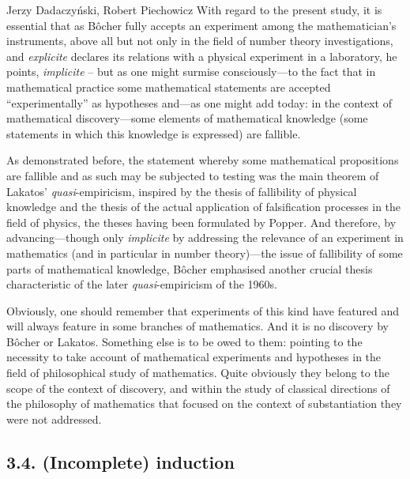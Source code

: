 \begin{artengenv}{Jerzy Dadaczyński, Robert Piechowicz}
With regard to the present study, it is essential that as Bôcher fully accepts an experiment among the mathematician's instruments, above all but not only in the field of number theory investigations, and \textit{explicite} declares its relations with a physical experiment in a laboratory, he points, \textit{implicite} – but as one might surmise consciously---to the fact that in mathematical practice some mathematical statements are accepted ``experimentally'' as hypotheses and---as one might add today: in the context of mathematical discovery---some elements of mathematical knowledge (some statements in which this knowledge is expressed) are fallible.

As demonstrated before, the statement whereby some mathematical propositions are fallible and as such may be subjected to testing was the main theorem of Lakatos' \textit{quasi}-empiricism, inspired by the thesis of fallibility of physical knowledge and the thesis of the actual application of falsification processes in the field of physics, the theses having been formulated by Popper. And therefore, by advancing---though only \textit{implicite} by addressing the relevance of an experiment in mathematics (and in particular in number theory)---the issue of fallibility of some parts of mathematical knowledge, Bôcher emphasised another crucial thesis characteristic of the later \textit{quasi}-empiricism of the 1960s.

Obviously, one should remember that experiments of this kind have featured and will always feature in some branches of mathematics. And it is no discovery by Bôcher or Lakatos. Something else is to be owed to them: pointing to the necessity to take account of mathematical experiments and hypotheses in the field of philosophical study of mathematics. Quite obviously they belong to the scope of the context of discovery, and within the study of classical directions of the philosophy of mathematics that focused on the context of substantiation they were not addressed.

\subsection{3.4. (Incomplete) induction}


\end{artengenv}
